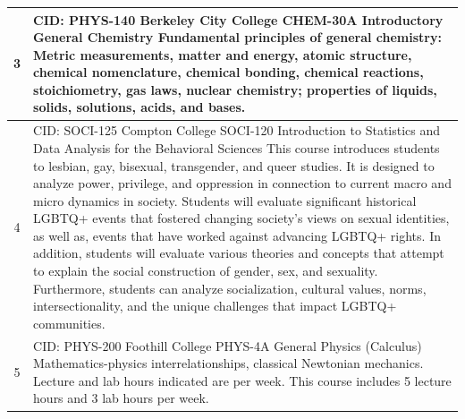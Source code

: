 {\begin{longtable}{ >{\baselineskip=12pt}c >{\baselineskip=12pt}p{} }
\midrule
3 & CID: PHYS-140 \newline
Berkeley City College \newline
CHEM-30A Introductory General Chemistry \newline
Fundamental principles of general chemistry: Metric measurements, matter and energy, atomic structure, chemical nomenclature, chemical bonding, chemical reactions, stoichiometry, gas laws, nuclear chemistry; properties of liquids, solids, solutions, acids, and bases.\\
\midrule
4 & CID: SOCI-125 \newline
Compton College \newline
SOCI-120 Introduction to Statistics and Data Analysis for the Behavioral Sciences \newline
This course introduces students to lesbian, gay, bisexual, transgender, and queer studies. It is designed to analyze power, privilege, and oppression in connection to current macro and micro dynamics in society. Students will evaluate significant historical LGBTQ+ events that fostered changing society's views on sexual identities, as well as, events that have worked against advancing LGBTQ+ rights. In addition, students will evaluate various theories and concepts that attempt to explain the social construction of gender, sex, and sexuality. Furthermore, students can analyze socialization, cultural values, norms, intersectionality, and the unique challenges that impact LGBTQ+ communities.\\
\midrule
5 & CID: PHYS-200 \newline
Foothill College \newline
PHYS-4A General Physics (Calculus) \newline
Mathematics-physics interrelationships, classical Newtonian mechanics. Lecture and lab hours indicated are per week. This course includes 5 lecture hours and 3 lab hours per week.\\
\bottomrule
\end{longtable}
}


